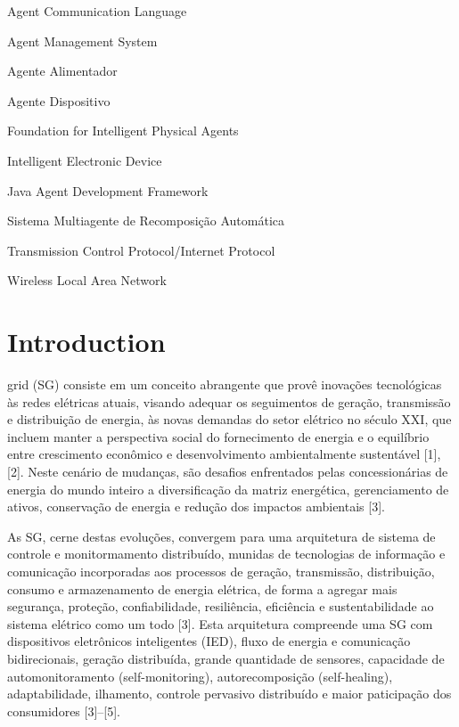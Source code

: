 \documentclass[journal]{IEEEtran}
\begin{document}
\begin{description}
  \item[ACL] Agent Communication Language
  \item[AMS] Agent Management System
  \item[AA] Agente Alimentador
  \item[AD] Agente Dispositivo
  \item[FIPA] Foundation for Intelligent Physical Agents
  \item[IED] Intelligent Electronic Device
  \item[JADE] Java Agent Development Framework
  \item[SMRA] Sistema Multiagente de Recomposição Automática
  \item[TCP/IP] Transmission Control Protocol/Internet Protocol
  \item[WLAN] Wireless Local Area Network
\end{description}

\section{Introduction}

 grid (SG) consiste em um conceito abrangente que provê inovações tecnológicas às redes elétricas atuais, visando adequar os seguimentos de geração, transmissão e distribuição de energia, às novas demandas do setor elétrico no século XXI, que incluem manter a perspectiva social do fornecimento de energia e o equilíbrio entre crescimento econômico e desenvolvimento ambientalmente sustentável [1], [2]. Neste cenário de mudanças, são desafios enfrentados pelas concessionárias de energia do mundo inteiro a diversificação da matriz energética, gerenciamento de ativos, conservação de energia e redução dos impactos ambientais [3].

As SG, cerne destas evoluções, convergem para uma arquitetura de sistema de controle e monitormamento distribuído, munidas de tecnologias de informação e comunicação incorporadas aos processos de geração, transmissão, distribuição, consumo e armazenamento de energia elétrica, de forma a agregar mais segurança, proteção, confiabilidade, resiliência, eficiência e sustentabilidade ao sistema elétrico como um todo [3]. Esta arquitetura compreende uma SG com dispositivos eletrônicos inteligentes (IED), fluxo de energia e comunicação bidirecionais, geração distribuída, grande quantidade de sensores, capacidade de automonitoramento (self-monitoring), autorecomposição (self-healing), adaptabilidade, ilhamento, controle pervasivo distribuído e maior paticipação dos consumidores [3]–[5].
\end{document}
